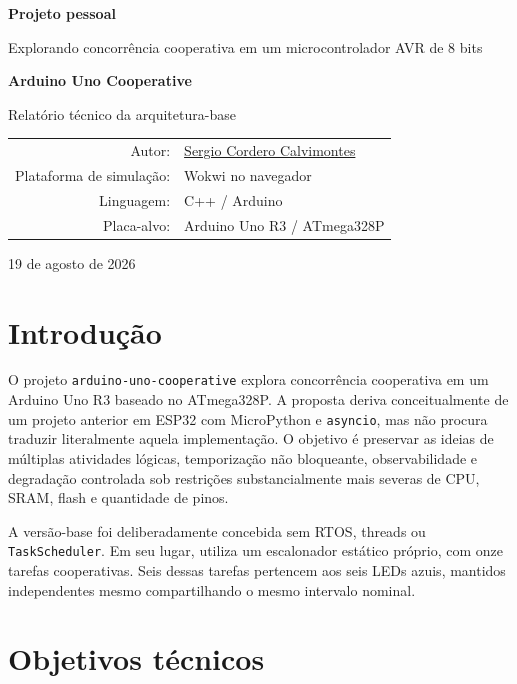 \documentclass[12pt,a4paper]{article}
\newcommand{\ProjectTitle}{Arduino Uno Cooperative}
\newcommand{\AuthorWebsite}{https://argus-kepheus.github.io/sergio-cordero-calvimontes/\#home}
\newcommand{\AuthorName}{\href{\AuthorWebsite}{Sergio Cordero Calvimontes}}
\newcommand{\RevisionDate}{19 de agosto de 2026}
\begin{document}
\begin{titlepage}
  \centering
  \vspace*{1.5cm}
  {\Large \textbf{Projeto pessoal}\par}
  \vspace{0.7cm}
  {\large Explorando concorrência cooperativa em um microcontrolador AVR de 8 bits\par}
  \vfill
  {\huge\bfseries \ProjectTitle\par}
  \vspace{0.8cm}
  {\Large Relatório técnico da arquitetura-base\par}
  \vfill
  \begin{tabular}{rl}
    Autor: & \AuthorName \\
    Plataforma de simulação: & Wokwi no navegador \\
    Linguagem: & C++ / Arduino \\
    Placa-alvo: & Arduino Uno R3 / ATmega328P \\
  \end{tabular}
  \vfill
  {\large \RevisionDate\par}
\end{titlepage}

\tableofcontents
\newpage

\section{Introdução}

O projeto \texttt{arduino-uno-cooperative} explora concorrência cooperativa em
um Arduino Uno R3 baseado no ATmega328P. A proposta deriva conceitualmente de
um projeto anterior em ESP32 com MicroPython e \texttt{asyncio}, mas não procura
traduzir literalmente aquela implementação. O objetivo é preservar as ideias de
múltiplas atividades lógicas, temporização não bloqueante, observabilidade e
degradação controlada sob restrições substancialmente mais severas de CPU, SRAM,
flash e quantidade de pinos.

A versão-base foi deliberadamente concebida sem RTOS, threads ou
\texttt{TaskScheduler}. Em seu lugar, utiliza um escalonador estático próprio,
com onze tarefas cooperativas. Seis dessas tarefas pertencem aos seis LEDs azuis,
mantidos independentes mesmo compartilhando o mesmo intervalo nominal.

\section{Objetivos técnicos}
\end{document}
